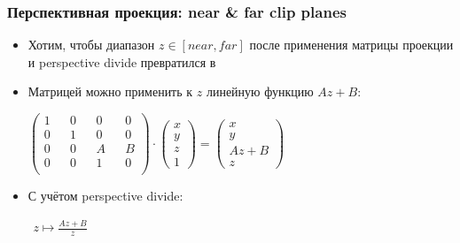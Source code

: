 \documentclass[10pt]{beamer}
\begin{document}
\begin{frame}[fragile]
\frametitle{Перспективная проекция: near \& far clip planes}
\begin{itemize}
\item Хотим, чтобы диапазон \begin{math}z\in [near,far]\end{math} после применения матрицы проекции и perspective divide превратился в \begin{math}[-1,1]\end{math}
\pause
\item Матрицей можно применить к \begin{math}z\end{math} линейную функцию \begin{math}Az+B\end{math}:
\begin{center}
\begin{math}
\begin{pmatrix}
1 && 0 && 0 && 0 \\
0 && 1 && 0 && 0 \\
0 && 0 && A && B \\
0 && 0 && 1 && 0 \\
\end{pmatrix}
\cdot
\begin{pmatrix}
x \\ y \\ z \\ 1
\end{pmatrix}
=
\begin{pmatrix}
x \\ y \\ Az+B \\ z
\end{pmatrix}
\end{math}
\end{center}
\pause
\item С учётом perspective divide:
\begin{center}
\begin{math}
\begin{matrix}
z \mapsto \frac{Az + B}{z}
\end{matrix}
\end{math}
\end{center}
\end{itemize}
\end{frame}
\end{document}
